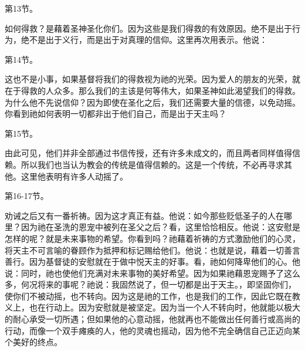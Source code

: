 第13节。\par

如何得救？是藉着圣神圣化你们。因为这些是我们得救的有效原因。绝不是出于行为，绝不是出于义行，而是出于对真理的信仰。这里再次用表示。他说：\par

第14节。\par

这也不是小事，如果基督将我们的得救视为祂的光荣。因为爱人的朋友的光荣，就在于得救的人众多。那么我们的主该是何等伟大，如果圣神如此渴望我们的得救。为什么他不先说信仰？因为即使在圣化之后，我们还需要大量的信德，以免动摇。你看到祂如何表明一切都非出于他们自己，而是出于天主吗？\par

第15节。\par

由此可见，他们并非全部通过书信传授，还有许多未成文的，而且两者同样值得信赖。所以我们也当认为教会的传统是值得信赖的。这是一个传统，不必再寻求其他。这里他表明有许多人动摇了。\par

第16-17节。\par

劝诫之后又有一番祈祷。因为这才真正有益。他说：如今那些贬低圣子的人在哪里？因为祂在圣洗的恩宠中被列在圣父之后？看，这里恰恰相反。他说：这安慰是怎样的呢？就是未来事物的希望。你看到吗？祂藉着祈祷的方式激励他们的心灵，将天主不可言喻的眷顾作为抵押和标记赐给他们。他说：也就是说，藉着一切善言善行。因为基督徒的安慰就在于做中悦天主的好事。看，祂如何降卑他们的心。他说：同时，祂也使他们充满对未来事物的美好希望。因为如果祂藉恩宠赐予了这么多，何况将来的事呢？祂说：我固然说了，但一切都是出于天主。，即坚固你们，使你们不被动摇，也不转向。因为这是祂的工作，也是我们的工作，因此它既在教义上，也在行动上。因为安慰就是被坚定。因为当一个人不转向时，他就能以极大的耐心承受一切所遇；但如果他的心意动摇，他就再也不能做出任何善行或高尚的行动，而像一个双手瘫痪的人，他的灵魂也摇动，因为他不完全确信自己正迈向某个美好的终点。\par

